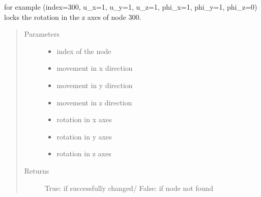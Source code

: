 \documentclass[letterpaper,10pt,english]{sphinxmanual}
\begin{document}
\begin{fulllineitems}
\begin{fulllineitems}
\begin{description}
\end{description}

for example (index=300, u\_x=1, u\_y=1, u\_z=1, phi\_x=1, phi\_y=1, phi\_z=0) locks the rotation
in the z axes of node 300.
\begin{quote}\begin{description}
\item[{Parameters}] \leavevmode\begin{itemize}
\item {} 
 \textendash{} index of the node

\item {} 
 \textendash{} movement in x direction

\item {} 
 \textendash{} movement in y direction

\item {} 
 \textendash{} movement in z direction

\item {} 
 \textendash{} rotation in x axes

\item {} 
 \textendash{} rotation in y axes

\item {} 
 \textendash{} rotation in z axes

\end{itemize}

\item[{Returns}] \leavevmode
True: if successfully changed/ False: if node not found

\end{description}\end{quote}

\end{fulllineitems}



\end{fulllineitems}
\end{document}
